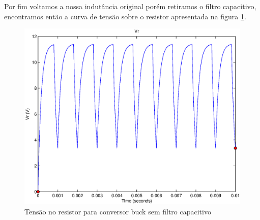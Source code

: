 \documentclass{article}
\begin{document}

Por fim voltamos a nossa indutância original porém retiramos o filtro capacitivo, encontramos então a curva de tensão sobre o resistor apresentada na figura \ref{fig:br3}.
\begin{figure}[H]
	\centering
	\includegraphics[width=0.7\linewidth]{matlab/buck/b_vr3}
	\caption{Tensão no resistor para conversor buck sem filtro capacitivo}
	\label{fig:br3}
\end{figure}

\end{document}

